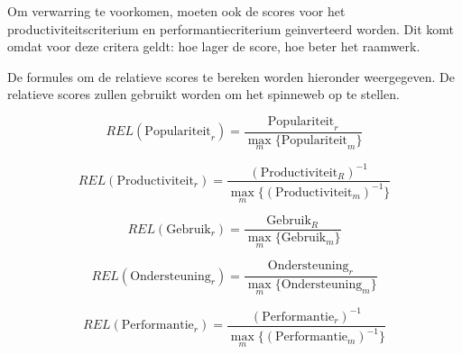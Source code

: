 Om verwarring te voorkomen, moeten ook de scores voor het productiviteitscriterium en performantiecriterium geinverteerd worden.
Dit komt omdat voor deze critera geldt:  hoe lager de score,  hoe beter het raamwerk.

De formules om de relatieve scores te bereken worden hieronder weergegeven.
De relatieve scores zullen gebruikt worden om het spinneweb op te stellen.

\begin{equation}
  REL(\text{Populariteit}_r)=\frac{\text{Populariteit}_r}{\max_{m}\{\text{Populariteit}_m\}}
  \label{eq:rel-populariteit}
\end{equation}

\begin{equation}
  REL(\text{Productiviteit}_r) = \frac{\left(\text{Productiviteit}_R\right)^{-1}}{\max_{m}\{\left(\text{Productiviteit}_m\right)^{-1}\}}
  \label{eq:rel-productiviteit}
\end{equation}

\begin{equation}
  REL(\text{Gebruik}_r) = \frac{\text{Gebruik}_R}{\max_{m}\{\text{Gebruik}_m\}}
  \label{eq:rel-gebruik}
\end{equation}

\begin{equation}
  REL(\text{Ondersteuning}_r) = \frac{\text{Ondersteuning}_r}{\max_{m}\{\text{Ondersteuning}_m\}}
  \label{eq:rel-ondersteuning}
\end{equation}

\begin{equation}
  REL(\text{Performantie}_r)= \frac{\left(\text{Performantie}_r\right)^{-1}}{\max_{m}\{\left(\text{Performantie}_m\right)^{-1}\}}
  \label{eq:rel-performantie}
\end{equation}
